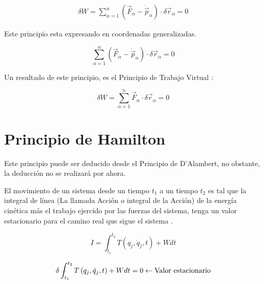 \documentclass[/home/hernan/Documentos/Apuntes_mecanica_teorica/main.tex]{subfiles}
\begin{document}
    \begin{align*}
        \delta W = \sum_{\alpha=1}^{n} \left( \vec{F}_{\alpha} - \dot{\vec{p}}_{\alpha} \right) \cdot \delta \vec{r}_{\alpha} = 0
    \end{align*}

    \begin{definition} 
        Este principio esta expresando en coordenadas generalizadas.

        \begin{equation}
            \sum_{\alpha=1}^{n} \left( \vec{F}_{\alpha} - \dot{\vec{p}}_{\alpha}\right) \cdot \delta \vec{r}_{\alpha} = 0
            \label{eq: DAlambertP}
        \end{equation}
        
    \end{definition}

    Un resultado de este principio, es el Principio de Trabajo Virtual :

        \begin{equation*}
            \delta W = \sum_{\alpha=1}^{n} \vec{F}_{\alpha}  \cdot \delta \vec{r}_{\alpha} = 0
        \end{equation*}



    \section{Principio de Hamilton}

    Este principio puede ser deducido desde el Principio de D'Alambert, no obstante, la deducción no se realizará por ahora.

    \begin{definition}
        El movimiento de un sistema desde un tiempo $t_1$ a un tiempo $t_2$ es tal que la integral de línea (La llamada Acción o integral de la Acción) de la energía cinética más el trabajo ejercido por las fuerzas del sistema, tenga un valor estacionario para el camino real que sigue el sistema .

        \begin{equation}
            I = \int_{t_1}^{t_2} T\left(q_{j}, \dot{q}_{j}, t\right) + W dt 
            \label{eq: PHamiltonE}
        \end{equation}

        \begin{equation*}
            \delta \int_{t_1}^{t_2} T\left(q_{j}, \dot{q}_{j}, t\right) + W dt = 0 \leftarrow \textup{Valor estacionario}
        \end{equation*}

    \end{definition}
\end{document}
